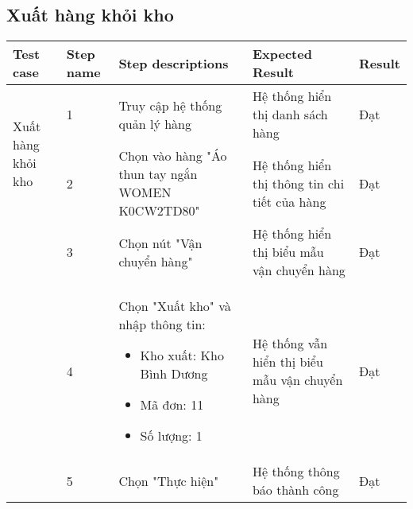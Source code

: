 \subsection{Xuất hàng khỏi kho}
{
    \setlength\extrarowheight{6pt}
    \begin{longtable}{| p{2.5cm}| p{1cm}| p{5.5cm}| p{4.5cm} | p{1.5cm} |}
        \hline
        \textbf{Test case} & \textbf{Step name} & \textbf{Step descriptions} & \textbf{Expected Result} & \textbf{Result} \\
        \hline
        \multirow[t]{2}{2.5cm}{Xuất hàng khỏi kho} & 1 & Truy cập hệ thống quản lý hàng & Hệ thống hiển thị danh sách hàng & Đạt \\
        \cline{2-5}
         & 2 & Chọn vào hàng "Áo thun tay ngắn WOMEN K0CW2TD80" & Hệ thống hiển thị thông tin chi tiết của hàng & Đạt \\
        \cline{2-5}
        & 3 & Chọn nút "Vận chuyển hàng" & Hệ thống hiển thị biểu mẫu vận chuyển hàng & Đạt \\
        \cline{2-5}
         & 4 & Chọn "Xuất kho" và nhập thông tin:
         \begin{itemize}
            \item Kho xuất: Kho Bình Dương
            \item Mã đơn: 11
            \item Số lượng: 1
         \end{itemize}
         & Hệ thống vẫn hiển thị biểu mẫu vận chuyển hàng & Đạt \\
         \cline{2-5}
         & 5 & Chọn "Thực hiện" & Hệ thống thông báo thành công & Đạt \\
        \hline
    \end{longtable} 
}

